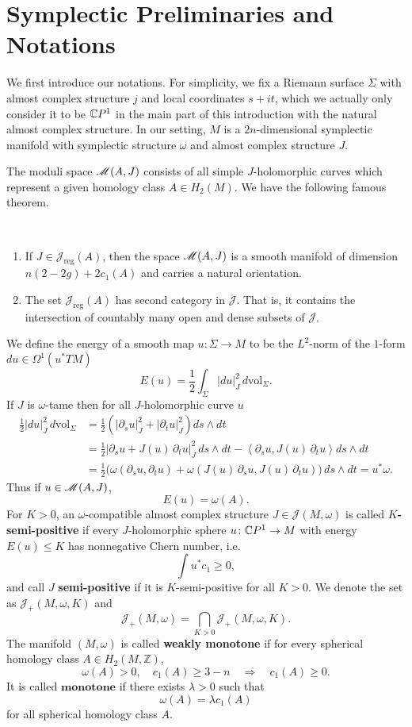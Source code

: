 \documentclass[twoside]{article}
\begin{document}
\section{Symplectic Preliminaries and Notations}

We first introduce our notations.
For simplicity, we fix a Riemann surface $\Sigma$ with almost complex structure $j$ 
and local coordinates $s+it$, which we actually only consider it to be $\mathbb{C}P^{1}$ 
in the main part of this introduction with the natural almost complex structure. 
In our setting, $M$ is a $2n$-dimensional symplectic manifold 
with symplectic structure $\omega$ and almost complex structure $J$. 

The moduli space $\mathscr{M}(A,J)$ consists of all simple $J$-holomorphic curves 
which represent a given homology class $A\in H_2(M)$. We have the following famous theorem.

\begin{theorem}
    \ 
    \begin{enumerate}
        \item If $J\in \mathscr{J}_{\mathrm{reg}}(A)$, 
        then the space $\mathscr{M}(A,J)$ is a smooth manifold of dimension $n(2-2g)+2c_1(A)$ and carries a natural orientation.
        \item The set $\mathscr{J}_{\mathrm{reg}}(A)$ has second category in $\mathscr{J}$. 
        That is, it contains the intersection of countably many open and dense subsets of $\mathscr{J}$.
    \end{enumerate}
\end{theorem}

We define the energy of a smooth map $u\colon \Sigma\rightarrow M$ 
to be the $L^2$-norm of the $1$-form $du\in \Omega^1(u^*TM)$
\[E(u)=\frac{1}{2}\int_{\Sigma}|du|^2_J\,d\mathrm{vol}_\Sigma.\]
If $J$ is $\omega$-tame then for all $J$-holomorphic curve $u$
\[ \begin{aligned}
    \frac{1}{2}|du|^2_J\,d\mathrm{vol}_\Sigma&=\frac{1}{2}\left(|\partial_su|_J^2+|\partial_tu|_J^2\right)ds\wedge dt \\
    &=\frac{1}{2}|\partial_su+J(u)\,\partial_tu|_J^2\,ds\wedge dt-\left\langle \partial_su,J(u)\,\partial_tu \right\rangle ds\wedge dt \\
    &=\frac{1}{2}\bigl(\omega(\partial_su,\partial_tu)+\omega(J(u)\,\partial_su,J(u)\,\partial_tu) \bigr)\,ds\wedge dt=u^*\omega.
\end{aligned} \]
Thus if $u\in \mathscr{M}(A,J)$,
\[E(u)=\omega(A).\]
For $K>0$, an $\omega$-compatible almost complex structure $J\in\mathscr{J}(M,\omega)$ 
is called \textbf{$K$-semi-positive} if every $J$-holomorphic sphere 
$u\colon \mathbb{C}P^{1}\rightarrow M$ with energy $E(u)\leq K$ has nonnegative Chern number, 
i.e. 
\[\int u^*c_1\geq0,\]
and call $J$ \textbf{semi-positive} 
if it is $K$-semi-positive for all $K>0$. We denote the set as $\mathscr{J}_+(M,\omega,K)$ and 
\[\mathscr{J}_+(M,\omega)=\bigcap_{K>0}\mathscr{J}_+(M,\omega,K).\]
The manifold $(M,\omega)$ is called \textbf{weakly monotone} 
if for every spherical homology class $A\in H_2(M,\mathbb{Z})$,
\[\omega(A)>0,\quad c_1(A)\geq 3-n \quad \Longrightarrow \quad c_1(A)\geq 0.\]
It is called $\textbf{monotone}$ if there exists $\lambda>0$ such that
\[\omega(A)=\lambda c_1(A)\]
for all spherical homology class $A$.
\end{document}
